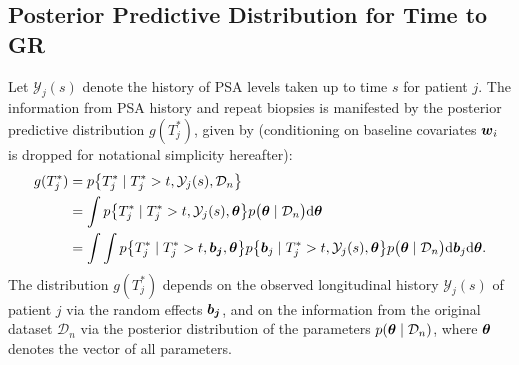 
\subsection{Posterior Predictive Distribution for Time to GR}
\label{subsec : ppd_time_to_GR}
Let $\mathcal{Y}_j(s)$ denote the history of PSA levels taken up to time $s$ for patient $j$. The information from PSA history and repeat biopsies is manifested by the posterior predictive distribution $g(T^*_j)$, given by (conditioning on baseline covariates $\boldsymbol{w}_i$ is dropped for notational simplicity hereafter):
\begin{equation}
\label{eq : dyn_dist_fail_time}
\begin{split}
g(T^*_j) &= p\big\{T^*_j \mid T^*_j > t, \mathcal{Y}_j(s), \mathcal{D}_n\big\}\\
&= \int p\big\{T^*_j \mid T^*_j > t, \mathcal{Y}_j(s), \boldsymbol{\theta}\big\}p\big(\boldsymbol{\theta} \mid \mathcal{D}_n\big) \mathrm{d} \boldsymbol{\theta}\\
&= \int \int p\big\{T^*_j \mid T^*_j > t, \boldsymbol{b_j}, \boldsymbol{\theta}\big\}p\big\{\boldsymbol{b}_j \mid T^*_j>t, \mathcal{Y}_j(s), \boldsymbol{\theta}\big\}p\big(\boldsymbol{\theta} \mid \mathcal{D}_n\big) \mathrm{d} \boldsymbol{b}_j \mathrm{d} \boldsymbol{\theta}.
\end{split}
\end{equation}
The distribution $g(T^*_j)$ depends on the observed longitudinal history $\mathcal{Y}_j(s)$ of patient $j$ via the random effects $\boldsymbol{b_j}$, and on the information from the original dataset $\mathcal{D}_n$ via the posterior distribution of the parameters $p(\boldsymbol{\theta} \mid \mathcal{D}_n)$, where $\boldsymbol{\theta}$ denotes the vector of all parameters.